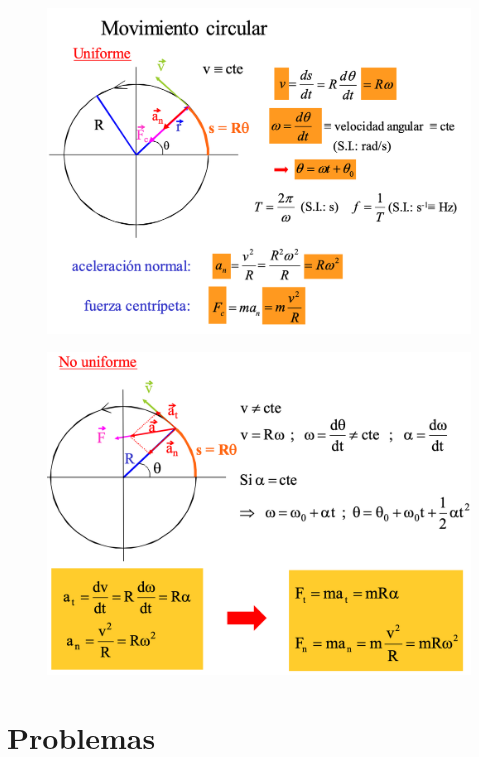 	\vspace{-4mm}\begin{figure}[H]
		\centering
		\includegraphics[width=.6\textwidth]{imagenes/imagenes02/T02IM31.png}
		\end{figure}
	\vspace{-5mm}\begin{figure}[H]
		\centering
		\includegraphics[width=.6\textwidth]{imagenes/imagenes02/T02IM32.png}
		\end{figure}


\section{Problemas}


